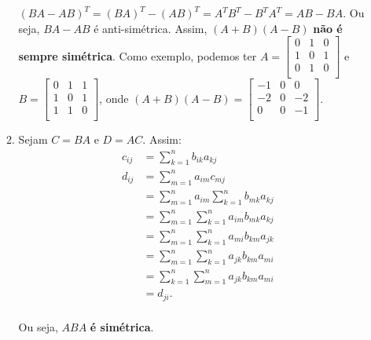 \documentclass[leqno]{article}
\begin{document}
\begin{enumerate}
\begin{enumerate}
        $(BA-AB)^T=(BA)^T-(AB)^T=A^TB^T-B^TA^T=AB-BA$. Ou seja, $BA-AB$ é anti-simétrica. Assim, $(A+B)(A-B)$ \textbf{não é sempre simétrica}. Como exemplo, podemos ter $A=\begin{bmatrix}
        0 & 1 & 0\\
        1 & 0 & 1\\
        0 & 1 & 0\\
        \end{bmatrix}$ e $B=\begin{bmatrix}
        0 & 1 & 1\\
        1 & 0 & 1\\
        1 & 1 & 0\\
        \end{bmatrix}$, onde $(A+B)(A-B)=\begin{bmatrix}
        -1 & 0 & 0\\
        -2 & 0 & -2\\
        0 & 0 & -1\\
        \end{bmatrix}$.
        
        \item Sejam $C=BA$ e $D=AC$. Assim:
        \begin{align*}
            c_{ij} &= \sum_{k=1}^n b_{ik}a_{kj}\\
            d_{ij} &= \sum_{m=1}^n a_{im}c_{mj}\\
            &= \sum_{m=1}^n a_{im}\sum_{k=1}^n b_{mk}a_{kj}\\
            &= \sum_{m=1}^n \sum_{k=1}^n a_{im}b_{mk}a_{kj}\\
            &= \sum_{m=1}^n \sum_{k=1}^n a_{mi}b_{km}a_{jk}\\
            &= \sum_{m=1}^n \sum_{k=1}^n a_{jk}b_{km}a_{mi}\\
            &= \sum_{k=1}^n \sum_{m=1}^n a_{jk}b_{km}a_{mi}\\
            &= d_{ji}\text{.}\\
        \end{align*}
        
        Ou seja, $ABA$ \textbf{é simétrica}.
        

\end{enumerate}
\end{enumerate}
\end{document}
